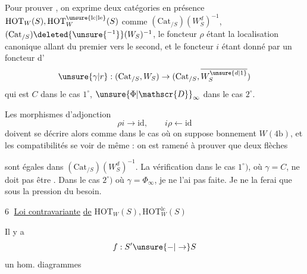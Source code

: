 
Pour  prouver  ,  on  exprime  deux catégories en présence $\mathrm{HOT}_W(S),\mathrm{HOT}_W^{\unsure{\mathrm{lc}|\mathrm{le}}}(S)$ comme $(\mathrm{Cat}_{/S})(W_S^d)^{-1}$, $(\mathrm{Cat}_{/S})\deleted{\unsure{^{-1}}}(W_S)^{-1}$, le foncteur $\rho$ étant la localisation canonique allant du premier vers le second, et le foncteur $i$ étant donné par un foncteur d'
\[
\unsure{\gamma|r}:(\mathrm{Cat}_{/S},W_S)\to(\mathrm{Cat}_{/S},\overline{W_S^{\unsure{d|1}}})
\]
qui est $C$ dans le cas $1^\circ$, $\unsure{\Phi|\mathscr{D}}_\infty$ dans le cas $2^\circ$.

Les morphismes d'adjonction
\[
\rho i\longrightarrow\mathrm{id},\qquad i\rho\longleftarrow\mathrm{id}
\]
doivent se décrire alors comme dans le cas où on suppose  bonnement $W(4\mathrm b)$, et les compatibilités se voir de même : on est ramené à prouver que deux flèches


sont égales dans $(\mathrm{Cat}_{/S})(W_S^d)^{-1}$. La vérification dans le cas $1^\circ)$, où $\gamma=C$, ne doit pas être . Dans le cas $2^\circ)$ où $\gamma=\Phi_\infty$, je ne l'ai pas faite. Je ne la ferai que sous la pression du besoin.

\textcircled{6} \uline{Loi contravariante} \uline{de} $\mathrm{HOT}_W(S),\mathrm{HOT}_W^{\mathrm{lc}}(S)$

Il y a 
\[
f:S'\unsure{\mathbin{-}|\to}S
\]
un hom.  diagrammes

